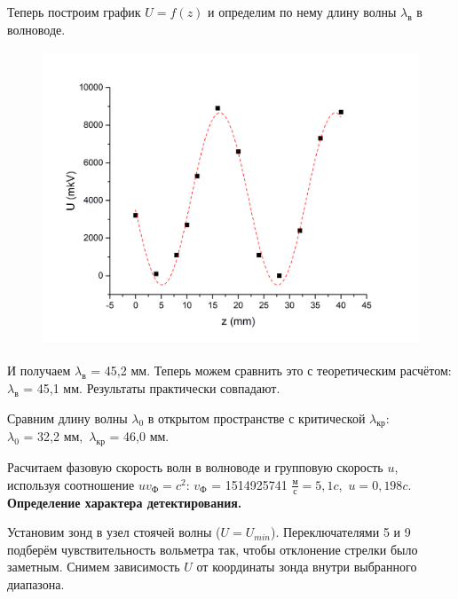 \documentclass[a4paper,12pt]{article}
\begin{document}
\newpage
Теперь построим график $U = f(z)$ и определим по нему длину волны $\lambda_{\text{в}}$ в волноводе.

\begin{figure}[H]
    \centering
    \includegraphics[width=13.5cm, height=8.8cm]{images/graph1.png}
\end{figure}


И получаем $\lambda_{\text{в}}$ = 45,2 мм. Теперь можем сравнить это с теоретическим расчётом: $\lambda_{\text{в}}$ = 45,1 мм. Результаты практически совпадают.

Сравним длину волны $\lambda_0$ в открытом пространстве с критической $\lambda_{\text{кр}}$:\\
$\lambda_0$ = 32,2 мм,\ $\lambda_{\text{кр}}$ = 46,0 мм.

Расчитаем фазовую скорость волн в волноводе и групповую скорость $u$, используя соотношение $uv_{\text{Ф}} = c^2$: $v_{\text{Ф}}$ = 1514925741 $\frac{\text{м}}{\text{с}} = 5,1c$,\ $u=0,198c$.\\

\textbf{Определение характера детектирования.}

Установим зонд в узел стоячей волны ($U = U_{min}$). Переключателями 5 и 9 подберём чувствительность вольметра так, чтобы отклонение стрелки было заметным. Снимем зависимость $U$ от координаты зонда внутри выбранного диапазона.
\end{document}
